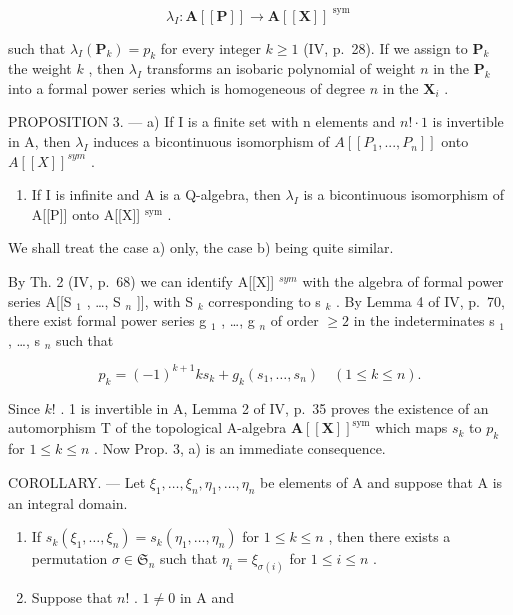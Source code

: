 \[
\lambda_ {I}: \mathbf {A} [ [ \mathbf {P} ] ] \rightarrow \mathbf {A} [ [ \mathbf {X} ] ] ^ {\text { sym }}
\]

such that \(\lambda_{I}(\mathbf{P}_{k}) = p_{k}\) for every integer \(k \geqslant 1\) (IV, p.~28). If we assign to \(\mathbf{P}_{k}\) the weight \(k\) , then \(\lambda_{I}\) transforms an isobaric polynomial of weight \(n\) in the \(\mathbf{P}_{k}\) into a formal power series which is homogeneous of degree \(n\) in the \(\mathbf{X}_{i}\) .

PROPOSITION 3. --- a) If I is a finite set with n elements and \(n! \cdot 1\) is invertible in A, then \(\lambda_{I}\) induces a bicontinuous isomorphism of \(A[[P_{1}, ..., P_{n}]]\) onto \(A[[X]]^{sym}\) .

\begin{enumerate}
\def\labelenumi{\alph{enumi})}
\setcounter{enumi}{1}
\tightlist
\item
  If I is infinite and A is a Q-algebra, then \(\lambda_{I}\) is a bicontinuous isomorphism of A{[}{[}P{]}{]} onto A{[}{[}X{]}{]} \(^{\text{sym}}\) .
\end{enumerate}

We shall treat the case a) only, the case b) being quite similar.

By Th. 2 (IV, p.~68) we can identify A{[}{[}X{]}{]} \(^{sym}\) with the algebra of formal power series A{[}{[}S \(_1\) , \ldots, S \(_n\) {]}{]}, with S \(_k\) corresponding to s \(_k\) . By Lemma 4 of IV, p.~70, there exist formal power series g \(_1\) , \ldots, g \(_n\) of order \(\geqslant 2\) in the indeterminates s \(_1\) , \ldots, s \(_n\) such that

\[
p _ {k} = (- 1) ^ {k + 1} k s _ {k} + g _ {k} (s _ {1}, \dots , s _ {n}) \quad (1 \leqslant k \leqslant n).
\]

Since \(k!\) . 1 is invertible in A, Lemma 2 of IV, p.~35 proves the existence of an automorphism T of the topological A-algebra \(\mathbf{A}[[\mathbf{X}]]^{\mathrm{sym}}\) which maps \(s_k\) to \(p_k\) for \(1 \leqslant k \leqslant n\) . Now Prop. 3, a) is an immediate consequence.

COROLLARY. --- Let \(\xi_1, \ldots, \xi_n, \eta_1, \ldots, \eta_n\) be elements of A and suppose that A is an integral domain.

\begin{enumerate}
\def\labelenumi{\alph{enumi})}
\item
  If \(s_k(\xi_1, \ldots, \xi_n) = s_k(\eta_1, \ldots, \eta_n)\) for \(1 \leqslant k \leqslant n\) , then there exists a permutation \(\sigma \in \mathfrak{S}_n\) such that \(\eta_i = \xi_{\sigma(i)}\) for \(1 \leqslant i \leqslant n\) .
\item
  Suppose that \(n!\) . \(1 \neq 0\) in A and
\end{enumerate}

